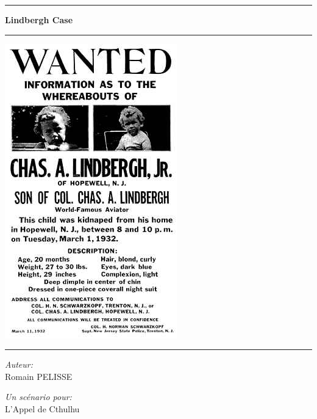 \begin{titlepage}


\begin{center}
\vspace{20pt}
\hrule
\vspace{3pt}
{ \huge \bfseries Lindbergh Case}
\vspace{3pt}
\hrule
\vspace{10pt}
\begin{center}
 \includegraphics[scale=0.9]{../docs/cover.jpg}
\end{center}
\vfill
\hrule
\vspace{3pt}

\begin{minipage}{0.4\textwidth}
\begin{flushleft} \large
\emph{Auteur:}\\
Romain PELISSE
\end{flushleft}
\end{minipage}
\begin{minipage}{0.4\textwidth}
\begin{flushright} \large
\emph{Un scénario pour:} \\
L'Appel de Cthulhu\textcopyright
\end{flushright}
\end{minipage} 
\end{center} 
\end{titlepage}